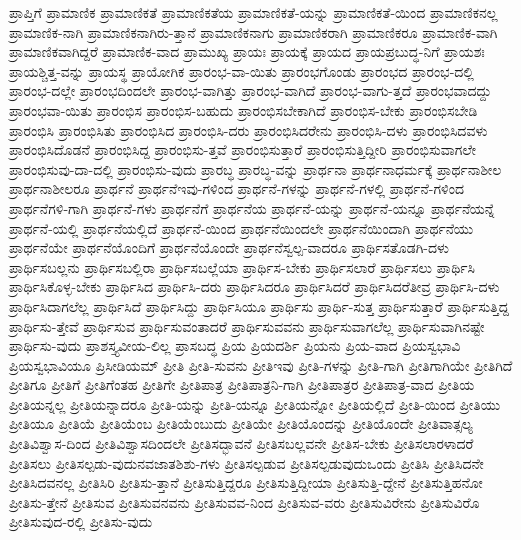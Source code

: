 {ಪ್ರಾಪ್ತಿಗೆ
ಪ್ರಾಮಾಣಿಕ
ಪ್ರಾಮಾಣಿಕತೆ
ಪ್ರಾಮಾಣಿಕತೆಯ
ಪ್ರಾಮಾಣಿಕತೆ-ಯನ್ನು
ಪ್ರಾಮಾಣಿಕತೆ-ಯಿಂದ
ಪ್ರಾಮಾಣಿಕನಲ್ಲ
ಪ್ರಾಮಾಣಿಕ-ನಾಗಿ
ಪ್ರಾಮಾಣಿಕನಾಗಿರು-ತ್ತಾನೆ
ಪ್ರಾಮಾಣಿಕನಾಗು
ಪ್ರಾಮಾಣಿಕರಾಗಿ
ಪ್ರಾಮಾಣಿಕರೂ
ಪ್ರಾಮಾಣಿಕ-ವಾಗಿ
ಪ್ರಾಮಾಣಿಕವಾಗಿದ್ದರೆ
ಪ್ರಾಮಾಣಿಕ-ವಾದ
ಪ್ರಾಮುಖ್ಯ
ಪ್ರಾಯಃ
ಪ್ರಾಯಕ್ಕೆ
ಪ್ರಾಯದ
ಪ್ರಾಯಪ್ರಬುದ್ಧ-ನಿಗೆ
ಪ್ರಾಯಶಃ
ಪ್ರಾಯಶ್ಚಿತ್ತ-ವನ್ನು
ಪ್ರಾಯಸ್ಥ
ಪ್ರಾಯೋಗಿಕ
ಪ್ರಾರಂಭ-ವಾ-ಯಿತು
ಪ್ರಾರಂಭಗೊಂಡು
ಪ್ರಾರಂಭದ
ಪ್ರಾರಂಭ-ದಲ್ಲಿ
ಪ್ರಾರಂಭ-ದಲ್ಲೇ
ಪ್ರಾರಂಭದಿಂದಲೇ
ಪ್ರಾರಂಭ-ವಾಗಿತ್ತು
ಪ್ರಾರಂಭ-ವಾಗಿದೆ
ಪ್ರಾರಂಭ-ವಾಗು-ತ್ತದೆ
ಪ್ರಾರಂಭವಾದದ್ದು
ಪ್ರಾರಂಭವಾ-ಯಿತು
ಪ್ರಾರಂಭಿಸ
ಪ್ರಾರಂಭಿಸ-ಬಹುದು
ಪ್ರಾರಂಭಿಸಬೇಕಾಗಿದೆ
ಪ್ರಾರಂಭಿಸ-ಬೇಕು
ಪ್ರಾರಂಭಿಸಬೇಡಿ
ಪ್ರಾರಂಭಿಸಿ
ಪ್ರಾರಂಭಿಸಿತು
ಪ್ರಾರಂಭಿಸಿದ
ಪ್ರಾರಂಭಿಸಿ-ದರು
ಪ್ರಾರಂಭಿಸಿದರೇನು
ಪ್ರಾರಂಭಿಸಿ-ದಳು
ಪ್ರಾರಂಭಿಸಿದವಳು
ಪ್ರಾರಂಭಿಸಿದೊಡನೆ
ಪ್ರಾರಂಭಿಸಿದ್ದ
ಪ್ರಾರಂಭಿಸು-ತ್ತವೆ
ಪ್ರಾರಂಭಿಸುತ್ತಾರೆ
ಪ್ರಾರಂಭಿಸುತ್ತಿದ್ದೀರಿ
ಪ್ರಾರಂಭಿಸುವಾಗಲೇ
ಪ್ರಾರಂಭಿಸುವು-ದಾ-ದಲ್ಲಿ
ಪ್ರಾರಂಭಿಸು-ವುದು
ಪ್ರಾರಬ್ಧ
ಪ್ರಾರಬ್ಧ-ವನ್ನು
ಪ್ರಾರ್ಥನಾ
ಪ್ರಾರ್ಥನಾಧರ್ಮಕ್ಕೆ
ಪ್ರಾರ್ಥನಾಶೀಲ
ಪ್ರಾರ್ಥನಾಶೀಲರೂ
ಪ್ರಾರ್ಥನೆ
ಪ್ರಾರ್ಥನೆಇವು-ಗಳಿಂದ
ಪ್ರಾರ್ಥನೆ-ಗಳನ್ನು
ಪ್ರಾರ್ಥನೆ-ಗಳಲ್ಲಿ
ಪ್ರಾರ್ಥನೆ-ಗಳಿಂದ
ಪ್ರಾರ್ಥನೆಗಳಿ-ಗಾಗಿ
ಪ್ರಾರ್ಥನೆ-ಗಳು
ಪ್ರಾರ್ಥನೆಗೆ
ಪ್ರಾರ್ಥನೆಯ
ಪ್ರಾರ್ಥನೆ-ಯನ್ನು
ಪ್ರಾರ್ಥನೆ-ಯನ್ನೂ
ಪ್ರಾರ್ಥನೆಯನ್ನೆ
ಪ್ರಾರ್ಥನೆ-ಯಲ್ಲಿ
ಪ್ರಾರ್ಥನೆಯಲ್ಲಿದೆ
ಪ್ರಾರ್ಥನೆ-ಯಿಂದ
ಪ್ರಾರ್ಥನೆಯಿಂದಲೇ
ಪ್ರಾರ್ಥನೆಯಿಂದಾಗಿ
ಪ್ರಾರ್ಥನೆಯು
ಪ್ರಾರ್ಥನೆಯೇ
ಪ್ರಾರ್ಥನೆಯೊಂದಿಗೆ
ಪ್ರಾರ್ಥನೆಯೊಂದೇ
ಪ್ರಾರ್ಥನೆಸ್ವಲ್ಪ-ವಾದರೂ
ಪ್ರಾರ್ಥಿಸತೊಡಗಿ-ದಳು
ಪ್ರಾರ್ಥಿಸಬಲ್ಲನು
ಪ್ರಾರ್ಥಿಸಬಲ್ಲಿರಾ
ಪ್ರಾರ್ಥಿಸಬಲ್ಲೆಯಾ
ಪ್ರಾರ್ಥಿಸ-ಬೇಕು
ಪ್ರಾರ್ಥಿಸಲಾರೆ
ಪ್ರಾರ್ಥಿಸಲು
ಪ್ರಾರ್ಥಿಸಿ
ಪ್ರಾರ್ಥಿಸಿಕೊಳ್ಳ-ಬೇಕು
ಪ್ರಾರ್ಥಿಸಿದ
ಪ್ರಾರ್ಥಿಸಿ-ದರು
ಪ್ರಾರ್ಥಿಸಿದರೂ
ಪ್ರಾರ್ಥಿಸಿದರೆ
ಪ್ರಾರ್ಥಿಸಿದರೆತೀವ್ರ
ಪ್ರಾರ್ಥಿಸಿ-ದಳು
ಪ್ರಾರ್ಥಿಸಿದಾಗಲೆಲ್ಲ
ಪ್ರಾರ್ಥಿಸಿದೆ
ಪ್ರಾರ್ಥಿಸಿದ್ದು
ಪ್ರಾರ್ಥಿಸಿಯೂ
ಪ್ರಾರ್ಥಿಸು
ಪ್ರಾರ್ಥಿ-ಸುತ್ತ
ಪ್ರಾರ್ಥಿಸುತ್ತಾರೆ
ಪ್ರಾರ್ಥಿಸುತ್ತಿದ್ದ
ಪ್ರಾರ್ಥಿಸು-ತ್ತೇವೆ
ಪ್ರಾರ್ಥಿಸುವ
ಪ್ರಾರ್ಥಿಸುವಂತಾದರೆ
ಪ್ರಾರ್ಥಿಸುವವನು
ಪ್ರಾರ್ಥಿಸುವಾಗಲೆಲ್ಲ
ಪ್ರಾರ್ಥಿಸುವಾಗಿನಷ್ಟೇ
ಪ್ರಾರ್ಥಿಸು-ವುದು
ಪ್ರಾಶಸ್ತ್ಯವೀಯ-ಲಿಲ್ಲ
ಪ್ರಾಸಬದ್ಧ
ಪ್ರಿಯ
ಪ್ರಿಯದರ್ಶಿ
ಪ್ರಿಯನು
ಪ್ರಿಯ-ವಾದ
ಪ್ರಿಯಸ್ವಭಾವಿ
ಪ್ರಿಯಸ್ವಭಾವಿಯೂ
ಪ್ರಿಸೀಡಿಯಮ್
ಪ್ರೀತಿ
ಪ್ರೀತಿ-ಸುವನು
ಪ್ರೀತಿಇವು
ಪ್ರೀತಿ-ಗಳನ್ನು
ಪ್ರೀತಿ-ಗಾಗಿ
ಪ್ರೀತಿಗಾಗಿಯೇ
ಪ್ರೀತಿಗಿದೆ
ಪ್ರೀತಿಗೂ
ಪ್ರೀತಿಗೆ
ಪ್ರೀತಿಗೆಂತಹ
ಪ್ರೀತಿಗೇ
ಪ್ರೀತಿಪಾತ್ರ
ಪ್ರೀತಿಪಾತ್ರನಿ-ಗಾಗಿ
ಪ್ರೀತಿಪಾತ್ರರ
ಪ್ರೀತಿಪಾತ್ರ-ವಾದ
ಪ್ರೀತಿಯ
ಪ್ರೀತಿಯನ್ನಲ್ಲ
ಪ್ರೀತಿಯನ್ನಾದರೂ
ಪ್ರೀತಿ-ಯನ್ನು
ಪ್ರೀತಿ-ಯನ್ನೂ
ಪ್ರೀತಿಯನ್ನೋ
ಪ್ರೀತಿಯಲ್ಲಿದೆ
ಪ್ರೀತಿ-ಯಿಂದ
ಪ್ರೀತಿಯು
ಪ್ರೀತಿಯೂ
ಪ್ರೀತಿಯೆ
ಪ್ರೀತಿಯೆಂಬ
ಪ್ರೀತಿಯೆಂಬುದು
ಪ್ರೀತಿಯೇ
ಪ್ರೀತಿಯೊಂದನ್ನು
ಪ್ರೀತಿಯೊಂದೇ
ಪ್ರೀತಿವಾತ್ಸಲ್ಯ
ಪ್ರೀತಿವಿಶ್ವಾಸ-ದಿಂದ
ಪ್ರೀತಿವಿಶ್ವಾಸದಿಂದಲೇ
ಪ್ರೀತಿಸದ್ಭಾವನೆ
ಪ್ರೀತಿಸಬಲ್ಲವನೇ
ಪ್ರೀತಿಸ-ಬೇಕು
ಪ್ರೀತಿಸಲಾರಳಾದರೆ
ಪ್ರೀತಿಸಲು
ಪ್ರೀತಿಸಲ್ಪಡು-ವುದುನವಜಾತಶಿಶು-ಗಳು
ಪ್ರೀತಿಸಲ್ಪಡುವ
ಪ್ರೀತಿಸಲ್ಪಡುವುದುಒಂದು
ಪ್ರೀತಿಸಿ
ಪ್ರೀತಿಸಿದನೇ
ಪ್ರೀತಿಸಿದವನಲ್ಲ
ಪ್ರೀತಿಸಿರಿ
ಪ್ರೀತಿಸು-ತ್ತಾನೆ
ಪ್ರೀತಿಸುತ್ತಿದ್ದರೂ
ಪ್ರೀತಿಸುತ್ತಿದ್ದೀಯಾ
ಪ್ರೀತಿಸುತ್ತಿ-ದ್ದೇನೆ
ಪ್ರೀತಿಸುತ್ತಿಹನೋ
ಪ್ರೀತಿಸು-ತ್ತೇನೆ
ಪ್ರೀತಿಸುವ
ಪ್ರೀತಿಸುವನವನು
ಪ್ರೀತಿಸುವವ-ನಿಂದ
ಪ್ರೀತಿಸುವ-ವರು
ಪ್ರೀತಿಸುವಿರೇನು
ಪ್ರೀತಿಸುವಿರೊ
ಪ್ರೀತಿಸುವುದ-ರಲ್ಲಿ
ಪ್ರೀತಿಸು-ವುದು
}
